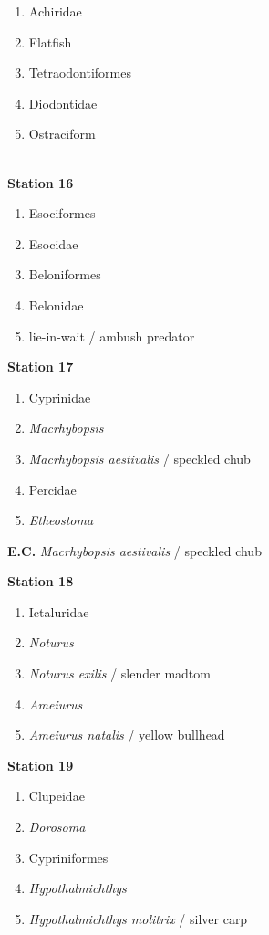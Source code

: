 \begin{enumerate}
\def\labelenumi{\arabic{enumi}.}
\setcounter{enumi}{69}
\item
  Achiridae
\item
  Flatfish
\item
  Tetraodontiformes
\item
  Diodontidae
\item
  Ostraciform
\end{enumerate}

\textbf{\\
Station 16}

\begin{enumerate}
\def\labelenumi{\arabic{enumi}.}
\setcounter{enumi}{74}
\item
  Esociformes
\item
  Esocidae
\item
  Beloniformes
\item
  Belonidae
\item
  lie-in-wait / ambush predator
\end{enumerate}

\textbf{Station 17}

\begin{enumerate}
\def\labelenumi{\arabic{enumi}.}
\setcounter{enumi}{79}
\item
  Cyprinidae
\item
  \emph{Macrhybopsis}
\item
  \emph{Macrhybopsis aestivalis} / speckled chub
\item
  Percidae
\item
  \emph{Etheostoma}
\end{enumerate}

\textbf{E.C.} \emph{Macrhybopsis aestivalis} / speckled chub

\textbf{Station 18}

\begin{enumerate}
\def\labelenumi{\arabic{enumi}.}
\setcounter{enumi}{84}
\item
  Ictaluridae
\item
  \emph{Noturus}
\item
  \emph{Noturus exilis} / slender madtom
\item
  \emph{Ameiurus}
\item
  \emph{Ameiurus natalis} / yellow bullhead
\end{enumerate}

\textbf{Station 19}

\begin{enumerate}
\def\labelenumi{\arabic{enumi}.}
\setcounter{enumi}{89}
\item
  Clupeidae
\item
  \emph{Dorosoma}
\item
  Cypriniformes
\item
  \emph{Hypothalmichthys}
\item
  \emph{Hypothalmichthys molitrix} / silver carp
\end{enumerate}

